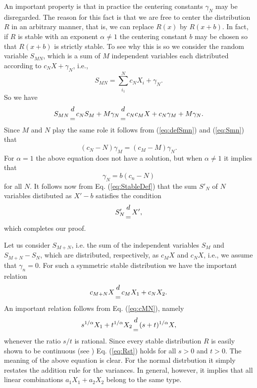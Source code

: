 An important property is that in practice the  centering constants
$\gamma_N$ may be disregarded. The reason for this fact is that we are free to
center the distribution $R$ in an arbitrary manner, that is, we can replace
$R(x)$ by $R(x+b)$. In fact, if $R$ is stable with an exponent $\alpha \ne 1$
the centering constant $b$ may be chosen so that $R(x+b)$ is strictly stable.
To see why this is so we consider the random variable $S_{MN}$, which is a sum
of $M$ independent variables each distributed according to $c_N X + \gamma_N$,
i.e.,
\begin{equation}
  \label{eq:defSmn}
  S_{MN} = \sum_{i_1}^{N} c_N X_i + \gamma_N.
\end{equation}
So we have
\begin{equation}
  \label{eq:Smn}
  S_{MN} {d \atop =}  c_N S_M + M \gamma_N {d \atop =} c_N c_M X +
                      c_N \gamma_M + M \gamma_N.
\end{equation}
Since $M$ and $N$ play the same role it follows from (\ref{eq:defSmn}) and 
(\ref{eq:Smn}) that
\begin{displaymath}
  (c_N -N) \gamma_M = (c_M -M) \gamma_N.
\end{displaymath}
For $\alpha =1$ the above equation does not have a solution, but when $\alpha
\ne 1$ it implies that
\begin{displaymath}
  \gamma_N = b(c_n -N) 
\end{displaymath}
for all $N$. It follows now from Eq. (\ref{eq:StableDef}) that the sum
$S'_N$ of $N$ variables distibuted as $X'-b$ satisfies the condition
\begin{displaymath}
  S'_N {d \atop =} X',
\end{displaymath}
which completes our proof.



Let us consider  $S_{M+N}$, i.e. the sum of the
independent variables $S_M$ and $S_{M+N} - S_{N}$, which are distributed,
respectively, as $c_M X$ and $c_N X$, i.e., we assume that $\gamma_n=0$. 
For such a symmetric stable distribution 
we have the important relation
\begin{equation}
  \label{eq:cMN}
  c_{M+N} X {d \atop =} c_M X_1 + c_N X_2. 
\end{equation}
An important relation follows from Eq. (\ref{eq:cMN}), namely
\begin{equation}
\label{eq:Rst}
  s^{1/\alpha} X_1 + t^{1/\alpha} X_2 {d \atop =} (s + t)^{1/\alpha} X,
\end{equation}
whenever the ratio $s/t$ is rational. Since every stable distribution $R$
is easily shown to be continuous (see \cite{Feller2}) Eq. (\ref{eq:Rst}) 
holds for all $s>0$ and $t>0$. The meaning of the above equation is clear. For
the normal distrbution it simply restates the addition rule for the
variances. In general, however, it implies that all linear combinations 
$a_1 X_1 + a_2 X_2$ belong to the same type.

